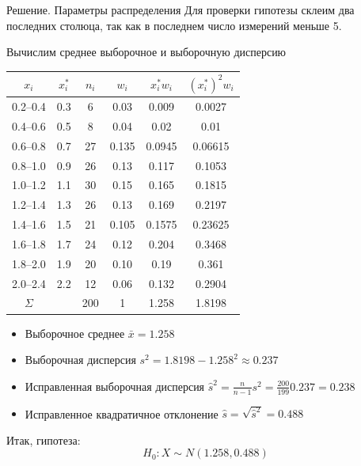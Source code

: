 \documentclass[unicode,11pt,notheorems,xcolor=table]{beamer}
\begin{document}
\begin{frame}[allowframebreaks]{Решение. Параметры распределения}
Для проверки гипотезы склеим два последних столюца, так как в последнем число измерений меньше 5.

Вычислим среднее выборочное и выборочную дисперсию
    
{\centering
    \begin{tabular}{cccccc}
        $x_i $     &$x^*_i$& $n_i$ & $w_i$ &  $x^*_iw_i$ & $(x^*_i)^2w_i$ \\
        \hline
        0.2--0.4   & 0.3   & 6     & 0.03   & 0.009     & 0.0027    \\  
        0.4--0.6   & 0.5   & 8     & 0.04   & 0.02      & 0.01      \\ 
        0.6--0.8   & 0.7   & 27    & 0.135  & 0.0945    & 0.06615   \\ 
        0.8--1.0   & 0.9   & 26    & 0.13   & 0.117     & 0.1053    \\ 
        1.0--1.2   & 1.1   & 30    & 0.15   & 0.165     & 0.1815    \\ 
        1.2--1.4   & 1.3   & 26    & 0.13   & 0.169     & 0.2197    \\ 
        1.4--1.6   & 1.5   & 21    & 0.105  & 0.1575    & 0.23625   \\ 
        1.6--1.8   & 1.7   & 24    & 0.12   & 0.204     & 0.3468    \\ 
        1.8--2.0   & 1.9   & 20    & 0.10   & 0.19      & 0.361    \\ 
        2.0--2.4   & 2.2   & 12    & 0.06   & 0.132     & 0.2904   \\
        \hline
        $\Sigma$ & & 200 & 1 &  1.258     & 1.8198  \\
    \end{tabular}
    \par }
\begin{itemize}
    \item Выборочное среднее $\bar{x} = 1.258 $
    \item Выборочная дисперсия $s^2 = 1.8198-1.258^2 \approx 0.237$
    \item Исправленная выборочная дисперсия 
    $\hat{s}^2 = \frac{n}{n-1} s^2 = \frac{200}{199} 0.237 = 0.238$
    \item Исправленное квадратичное отклонение
    $\hat{s} = \sqrt{\hat{s}^2}=0.488$
\end{itemize}

\bigskip

Итак, гипотеза:
$$
    H_0\colon X \sim N(1.258,0.488)
$$ 

\end{frame}
\end{document}
